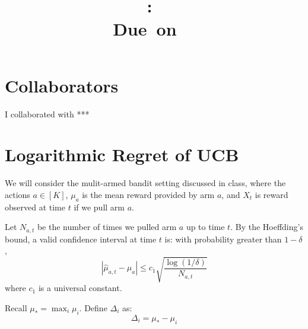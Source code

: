 \documentclass{article}
\title{
    \vspace{2in}
    \textmd{\textbf{\hmwkClass:\ \hmwkTitle}}\\
    \normalsize\vspace{0.1in}\small{Due\ on\ \hmwkDueDate\ }\\
    \vspace{3in}
}
\author{\textbf{\hmwkAuthorName}}
\date{}
\begin{document}
\maketitle
\pagebreak

\section*{Collaborators}
I collaborated with ***


\section{Logarithmic Regret of UCB}


We will consider the mulit-armed bandit setting discussed in class, where the actions $a \in [K]$, $\mu_a$ is the mean reward provided by arm $a$, and $X_t$ is reward observed at time $t$ if we pull arm $a$.

Let $N_{a,t}$ be the number of times we pulled arm $a$ up to time $t$. By the Hoeffding's bound, a valid confidence interval at time $t$ is: with probability greater than $1-\delta$,
\[
	| \hat \mu_{a,t} - \mu_a | \leq c_1 \sqrt{\frac{\log(1/\delta)}{N_{a,t}}}
\]
where $c_1$ is a universal constant.

Recall $\mu_*=\max_i \mu_i$. Define $\Delta_i$ as:
\[
	\Delta_i = \mu_* - \mu_i 
\]
\end{document}

